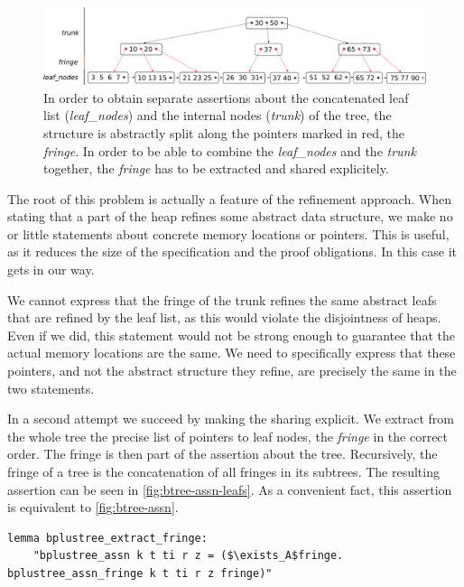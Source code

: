 \documentclass[a4paper,UKenglish,cleveref, autoref, thm-restate]{lipics-v2021}
\newcommand{\btree}{B$^+$-tree}
\begin{document}
\begin{figure}
    \centering
    \includegraphics[width=1\linewidth]{btree-view-split.pdf}
    \caption[Split view of the \btree]
    {In order to obtain separate assertions about the concatenated leaf list (\emph{leaf\_nodes})
    and the internal nodes (\emph{trunk}) of the tree, the structure is abstractly split along the
    pointers marked in red, the \emph{fringe}. In order to be able to combine the \emph{leaf\_nodes} and the \emph{trunk} together,
    the \emph{fringe} has to be extracted and shared explicitely.}
    \label{fig:btree-view-split}
\end{figure}

The root of this problem is actually a feature of the refinement approach.
When stating that a part of the heap
refines some abstract data structure,
we make no or little statements about concrete memory locations or pointers.
This is useful, as it reduces the size of the specification
and the proof obligations.
In this case it gets in our way.


We cannot express that the fringe of the trunk refines the same abstract leafs
that are refined by the leaf list,
as this would violate the disjointness of heaps.
Even if we did, this statement would not be strong enough
to guarantee that the actual memory locations
are the same.
We need to specifically express that these pointers,
and not the abstract structure they refine,
are precisely the same in the two statements.

In a second attempt we succeed by making the sharing explicit.
We extract from the whole tree the precise list of pointers to leaf nodes, the \emph{fringe}
in the correct order.
The fringe is then part of the assertion about the tree.
Recursively, the fringe of a tree is the concatenation of all fringes
in its subtrees.
The resulting assertion can be seen in \autoref{fig:btree-assn-leafs}.
As a convenient fact, this assertion is equivalent to \autoref{fig:btree-assn}.

\begin{lstlisting}[mathescape=true, language=Isabelle,label=lst:btree-extract-fringe]
lemma bplustree_extract_fringe:
    "bplustree_assn k t ti r z = ($\exists_A$fringe. bplustree_assn_fringe k t ti r z fringe)"
\end{lstlisting}
\end{document}

